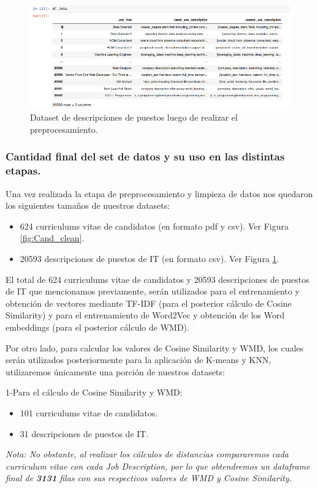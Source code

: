 \documentclass[12pt,a4paper]{article}
\begin{document}
\begin{sloppypar}
\begin{figure}[H]    
 \centering
 \includegraphics[width=1\textwidth]{images/Implementacion/7-DS_Jobs_Clean}
 \captionsetup{justification=centering,margin=3cm}
 \caption{Dataset de descripciones de puestos luego de realizar el preprocesamiento.}
 \label{fig:Desc_clean}
\end{figure}

\cleardoublepage

\subsubsection{Cantidad final del set de datos y su uso en las distintas etapas.}\label{etapas_set_datos}

Una vez realizada la etapa de preprocesamiento y limpieza de datos nos quedaron los siguientes tamaños de nuestros datasets:
\begin{itemize}
\item 624 curriculums vitae de candidatos (en formato pdf y csv). Ver Figura \ref{fig:Cand_clean}.
\item 20593 descripciones de puestos de IT (en formato csv). Ver Figura \ref{fig:Desc_clean}.
\end{itemize}

El total de 624 curriculums vitae de candidatos y 20593 descripciones de puestos de IT que mencionamos previamente, serán utilizados para el entrenamiento y obtención de vectores mediante TF-IDF (para el posterior cálculo de Cosine Similarity) y para el entrenamiento de Word2Vec y obtención de los Word embeddings (para el posterior cálculo de WMD).

Por otro lado, para calcular los valores de Cosine Similarity y WMD, los cuales serán utilizados posteriormente para la aplicación de K-means y KNN, utilizaremos únicamente una porción de nuestros datasets:

1-Para el cálculo de Cosine Similarity y WMD:
\begin{itemize}
\item 101 curriculums vitae de candidatos.
\item 31 descripciones de puestos de IT.
\end{itemize}
\textit{Nota: No obstante, al realizar los cálculos de distancias compararemos cada curriculum vitae con cada Job Description, por lo que obtendremos un dataframe final de \textbf{3131} filas con sus respectivos valores de WMD y Cosine Similarity.}


\end{sloppypar}
\end{document}
